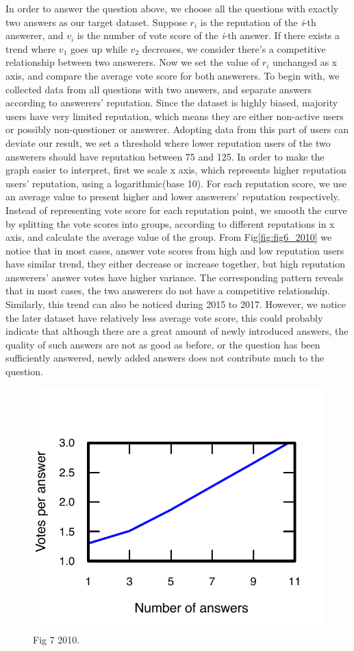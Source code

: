 In order to answer the question above, we choose all the questions with exactly two answers as our target dataset. Suppose $r_{i}$ is the reputation of the \textit{i}-th answerer, and $v_{i}$ is the number of vote score of the \textit{i}-th answer. If there exists a trend where $v_{1}$ goes up while $v_{2}$ decreases, we consider there's a competitive relationship between two answerers. Now we set the value of $r_{i}$ unchanged as x axis, and compare the average vote score for both answerers. To begin with, we collected data from all questions with two answers, and separate answers according to answerers' reputation. Since the dataset is highly biased, majority users have very limited reputation, which means they are either non-active users or possibly non-questioner or answerer. Adopting data from this part of users can deviate our result, we set a threshold where lower reputation users of the two answerers should have reputation between 75 and 125. In order to make the graph easier to interpret, first we scale x axis, which represents higher reputation users' reputation, using a logarithmic(base 10). For each reputation score, we use an average value to present higher and lower answerers' reputation respectively. Instead of representing vote score for each reputation point, we smooth the curve by splitting the vote scores into groups, according to different reputations in x axis, and calculate the average value of the group. From Fig\ref{fig:fig6_2010} we notice that in most cases, answer vote scores from high and low reputation users have similar trend, they either decrease or increase together, but high reputation answerers' answer votes have higher variance. The corresponding pattern reveals that in most cases, the two answerers do not have a competitive relationship. Similarly, this trend can also be noticed during 2015 to 2017. However, we notice the later dataset have relatively less average vote score, this could probably indicate that although there are a great amount of newly introduced answers, the quality of such answers are not as good as before, or the question has been sufficiently answered, newly added answers does not contribute much to the question. 


\begin{figure}[!t]
	\centering
	\includegraphics[width=0.8\columnwidth]{img/Fig7_2010.pdf}
	\caption{Fig 7 2010.}
	\label{fig:fig7_2010}
\end{figure}

